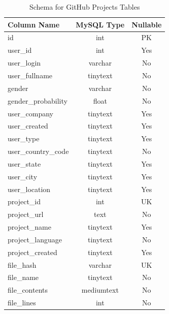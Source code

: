 \documentclass{article}
\begin{document}
\begin{table}[h!]
    \begin{center}
        \caption{Schema for GitHub Projects Tables}
        \label{tab:git_projects_schema}
        \begin{tabular}{|l | c | c |}
            \hline
            \textbf{Column Name} & \textbf{MySQL Type} & \textbf{Nullable}\\
            \hline
            id & int & PK\\
            user{\_}id & int & Yes\\
            user{\_}login & varchar & No\\
            user{\_}fullname & tinytext & No\\
            gender & varchar & No\\
            gender{\_}probability & float & No\\
            user{\_}company  & tinytext & Yes\\
            user{\_}created & tinytext & Yes\\
            user{\_}type & tinytext & Yes\\
            user{\_}country{\_}code & tinytext & No\\
            user{\_}state & tinytext & Yes\\
            user{\_}city & tinytext & Yes\\
            user{\_}location & tinytext & Yes\\
            \hline
            project{\_}id & int & UK\\
            project{\_}url & text & No\\
            project{\_}name & tinytext & Yes\\
            project{\_}language & tinytext & No\\
            project{\_}created & tinytext & Yes\\
            \hline
            file{\_}hash & varchar & UK\\
            file{\_}name & tinytext & No\\
            file{\_}contents & mediumtext & No\\
            file{\_}lines & int & No\\
            \hline
        \end{tabular}
    \end{center}
\end{table}
\end{document}
